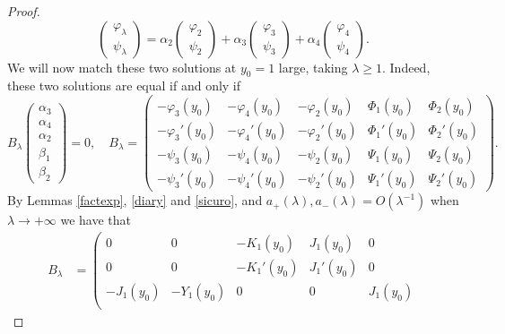 \documentclass[11 pt]{amsart}
\theoremstyle{definition}
\theoremstyle{remark}
\numberwithin{equation}{section}
\begin{document}
\begin{proof}
  \[ \left(\begin{array}{c}
       \varphi_{\lambda}\\
       \psi_{\lambda}
     \end{array}\right) = \alpha_2 \left(\begin{array}{c}
       \varphi_2\\
       \psi_2
     \end{array}\right) + \alpha_3 \left(\begin{array}{c}
       \varphi_3\\
       \psi_3
     \end{array}\right) + \alpha_4 \left(\begin{array}{c}
       \varphi_4\\
       \psi_4
     \end{array}\right) . \]
We will now match these two solutions at $y_0 = 1$ large, taking $\lambda \geqslant 1$. Indeed, these two solutions are equal if and only if
  \[ B_{\lambda} \left(\begin{array}{c}
       \alpha_3\\
       \alpha_4\\
       \alpha_2\\
       \beta_1\\
       \beta_2
     \end{array}\right) = 0, \quad  B_{\lambda} = \left( \begin{array}{ccccc} - \varphi_3 (y_0) & - \varphi_4 (y_0) &  -\varphi_2 (y_0) &  \Phi_1 (y_0) & \Phi_2 (y_0)\\
      - \varphi_3' (y_0) & - \varphi_4' (y_0) &  -\varphi_2' (y_0) &
       \Phi_1' (y_0) & \Phi_2' (y_0)\\
      - \psi_3 (y_0) & - \psi_4 (y_0) & - \psi_2 (y_0) &
      \Psi_1 (y_0) & \Psi_2 (y_0)\\
      - \psi_3' (y_0) & - \psi_4' (y_0) &  -\psi_2' (y_0) & 
      \Psi_1' (y_0) & \Psi_2' (y_0)
    \end{array}\right). \]
By Lemmas \ref{factexp}, \ref{diary}
  and \ref{sicuro}, and ${a_+ (\lambda)}, a_- (\lambda) =O(\lambda^{-1})$ when $\lambda
  \rightarrow + \infty$ we have that
\begin{align*}
B_{\lambda}  & = \left(\begin{array}{ccccc}
      0 & 0 & -K_1(y_0) & J_1(y_0) & 0\\
      0 & 0 & -K_1'(y_0)  & J_1 '(y_0)& 0\\
      -J_1(y_0) &-Y_1 (y_0)& 0 & 0 & J_1 (y_0)\\

\end{array}
\end{align*}
\end{proof}
\end{document}
